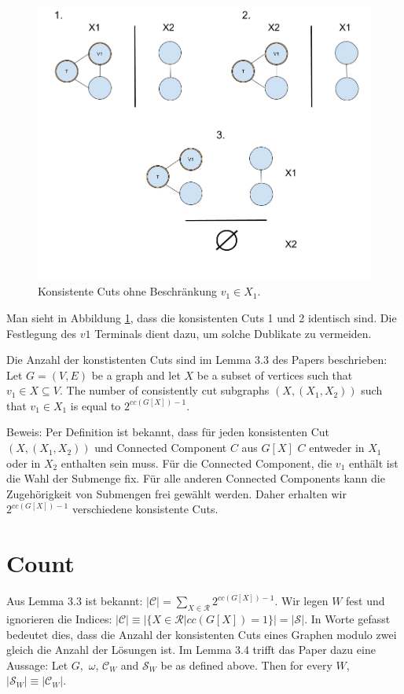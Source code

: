 \begin{figure}
\label{fig:st_cut}
  \centering
    \includegraphics[width=1.0\textwidth]{./imgs/terminal_v1.png}
  	\caption{Konsistente Cuts ohne Beschränkung $v_1 \in X_1$.}
\end{figure}

Man sieht in Abbildung \ref{fig:st_cut}, dass die konsistenten Cuts 1 und 2 identisch sind. Die Festlegung des $v1$ Terminals dient dazu, um solche Dublikate zu vermeiden.

Die Anzahl der konstistenten Cuts sind im Lemma 3.3 des Papers beschrieben:\\
Let $G=(V,E)$ be a graph and let $X$ be a subset of vertices such that $v_1 \in X \subseteq V$. The number of consistently cut subgraphs $(X,(X_1,X_2))$ such that $v_1 \in X_1$ is equal to $2^{cc(G[X])-1}$.

Beweis: Per Definition ist bekannt, dass für jeden konsistenten Cut $(X,(X_1,X_2))$ und Connected Component $C$ aus $G[X]$ $C$ entweder in $X_1$ oder in $X_2$ enthalten sein muss. Für die Connected Component, die $v_1$ enthält ist die Wahl der Submenge fix. Für alle anderen Connected Components kann die Zugehörigkeit von Submengen frei gewählt werden. Daher erhalten wir $2^{cc(G[X])-1}$ verschiedene konsistente Cuts.

\section{Count}
\label{sec:st_count}
Aus Lemma 3.3 ist bekannt: $|\mathcal{C}|=\sum_{X \in \mathcal{R}} 2^{cc(G[X])-1}$. Wir legen $W$ fest und ignorieren die Indices: $|\mathcal{C}| \equiv |\{X \in \mathcal{R} |cc(G[X]) = 1\}| = |\mathcal{S}|$. In Worte gefasst bedeutet dies, dass die Anzahl der konsistenten Cuts eines Graphen modulo zwei gleich die Anzahl der Lösungen ist. Im Lemma 3.4 trifft das Paper dazu eine Aussage: Let $G,$ $\omega$, $\mathcal{C}_W$ and $\mathcal{S}_W$ be as defined above. Then for every $W$, $|\mathcal{S}_W| \equiv |\mathcal{C}_W|$.

